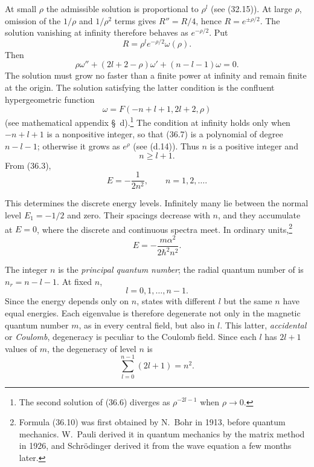 At small $\rho$ the admissible solution is proportional to $\rho^l$ (see
(32.15)). At large $\rho$, omission of the $1/\rho$ and $1/\rho^2$ terms
gives $R''=R/4$, hence $R=e^{\pm\rho/2}$. The solution vanishing at infinity
therefore behaves as $e^{-\rho/2}$. Put
\begin{equation}R=\rho^le^{-\rho/2}\omega(\rho).\tag{36.5}\end{equation}
Then
\begin{equation}
 \rho\omega''+(2l+2-\rho)\omega'+(n-l-1)\omega=0. \tag{36.6}
\end{equation}
The solution must grow no faster than a finite power at infinity and remain
finite at the origin.
The solution satisfying the latter condition is the confluent hypergeometric
function
\begin{equation}\omega=F(-n+l+1,2l+2,\rho)\tag{36.7}\end{equation}
(see mathematical appendix \S~d).\footnote{The second solution of (36.6)
diverges as $\rho^{-2l-1}$ when $\rho\to0$.} The condition at infinity holds
only when $-n+l+1$ is a nonpositive integer, so that (36.7) is a polynomial
of degree $n-l-1$; otherwise it grows as $e^\rho$ (see (d.14)). Thus $n$ is a
positive integer and
\begin{equation}n\geq l+1.\tag{36.8}\end{equation}
From (36.3),
\begin{equation}E=-\frac1{2n^2},\qquad n=1,2,\ldots.\tag{36.9}\end{equation}

This determines the discrete energy levels. Infinitely many lie between the
normal level $E_1=-1/2$ and zero. Their spacings decrease with $n$, and they
accumulate at $E=0$, where the discrete and continuous spectra meet. In
ordinary units,\footnote{Formula (36.10) was first obtained by N.~Bohr in
1913, before quantum mechanics. W.~Pauli derived it in quantum mechanics by
the matrix method in 1926, and Schrödinger derived it from the wave equation
a few months later.}
\begin{equation}E=-\frac{m\alpha^2}{2\hbar^2n^2}.\tag{36.10}\end{equation}

The integer $n$ is the \emph{principal quantum number}; the radial quantum
number of  is $n_r=n-l-1$. At fixed $n$,
\begin{equation}l=0,1,\ldots,n-1.\tag{36.11}\end{equation}
Since the energy depends only on $n$, states with different $l$ but the same
$n$ have equal energies.
Each eigenvalue is therefore degenerate not only in the magnetic quantum
number $m$, as in every central field, but also in $l$. This latter,
\emph{accidental} or \emph{Coulomb}, degeneracy is peculiar to the Coulomb
field. Since each $l$ has $2l+1$ values of $m$, the degeneracy of level $n$ is
\begin{equation}\sum_{l=0}^{n-1}(2l+1)=n^2.\tag{36.12}\end{equation}

